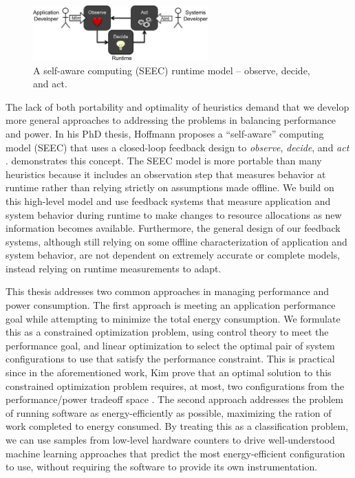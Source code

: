 \begin{figure}[t]
  \begin{centering}
  \includegraphics[width=0.6\textwidth]{figs/SEEC.png}
  \caption{A self-aware computing (SEEC) runtime model -- observe, decide, and act.}
  \label{fig:seec}
  \end{centering}
\end{figure}

The lack of both portability and optimality of heuristics demand that we develop more general approaches to addressing the problems in balancing performance and power.
In his PhD thesis, Hoffmann proposes a ``self-aware'' computing model (SEEC) that uses a closed-loop feedback design to \emph{observe}, \emph{decide}, and \emph{act} \cite{HoffmannPhD}.
 demonstrates this concept.
The SEEC model is more portable than many heuristics because it includes an observation step that measures behavior at runtime rather than relying strictly on assumptions made offline.
We build on this high-level model and use feedback systems that measure application and system behavior during runtime to make changes to resource allocations as new information becomes available.
Furthermore, the general design of our feedback systems, although still relying on some offline characterization of application and system behavior, are not dependent on extremely accurate or complete models, instead relying on runtime measurements to adapt.


This thesis addresses two common approaches in managing performance and power consumption.
The first approach is meeting an application performance goal while attempting to minimize the total energy consumption.
We formulate this as a constrained optimization problem, using control theory to meet the performance goal, and linear optimization to select the optimal pair of system configurations to use that satisfy the performance constraint.
This is practical since in the aforementioned work, Kim \etal prove that an optimal solution to this constrained optimization problem requires, at most, two configurations from the performance/power tradeoff space \cite{kim-cpsna2015}.
The second approach addresses the problem of running software as energy-efficiently as possible, \ie maximizing the ration of work completed to energy consumed.
By treating this as a classification problem, we can use samples from low-level hardware counters to drive well-understood machine learning approaches that predict the most energy-efficient configuration to use, without requiring the software to provide its own instrumentation.
